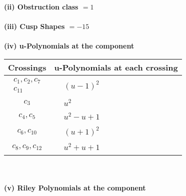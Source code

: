 \documentclass[1p]{elsarticle_modified}
\theoremstyle{definition}
\begin{document}
\flushleft \textbf{(ii) Obstruction class $= 1$}\\~\\
\flushleft \textbf{(iii) Cusp Shapes $= -15$}\\~\\
\newpage\renewcommand{\arraystretch}{1}
\flushleft \textbf{(iv) u-Polynomials at the component}\newline \\
\begin{tabular}{m{50pt}|m{274pt}}
Crossings & \hspace{64pt}u-Polynomials at each crossing \\
\hline $$\begin{aligned}c_{1},c_{2},c_{7}\\c_{11}\end{aligned}$$&$\begin{aligned}
&(u-1)^2
\end{aligned}$\\
\hline $$\begin{aligned}c_{3}\end{aligned}$$&$\begin{aligned}
&u^2
\end{aligned}$\\
\hline $$\begin{aligned}c_{4},c_{5}\end{aligned}$$&$\begin{aligned}
&u^2- u+1
\end{aligned}$\\
\hline $$\begin{aligned}c_{6},c_{10}\end{aligned}$$&$\begin{aligned}
&(u+1)^2
\end{aligned}$\\
\hline $$\begin{aligned}c_{8},c_{9},c_{12}\end{aligned}$$&$\begin{aligned}
&u^2+u+1
\end{aligned}$\\
\hline
\end{tabular}\\~\\
\newpage\renewcommand{\arraystretch}{1}
\flushleft \textbf{(v) Riley Polynomials at the component}\newline \\
\end{document}
